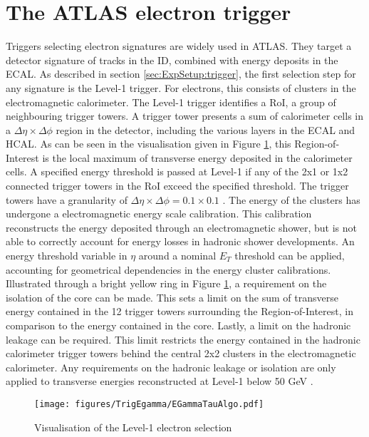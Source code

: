 \section{The ATLAS electron trigger}
\label{sec:trigg:Intro}
Triggers selecting electron signatures are widely used in ATLAS.  They target a detector signature of tracks in the \ac{ID},  combined with energy deposits in the \ac{ECAL}.
As described in section \ref{sec:ExpSetup:trigger},  the first selection step for any signature is the Level-1 trigger.  For electrons,  this consists of clusters in the electromagnetic calorimeter.  The Level-1 trigger identifies a \ac{RoI},  a group of neighbouring trigger towers.  A trigger tower presents a sum of calorimeter cells in a $\Delta \eta \times \Delta \phi$ region in the detector,  including the various layers in the \ac{ECAL} and \ac{HCAL}.  As can be seen in the visualisation given in Figure \ref{L1Vis},  this Region-of-Interest is the local maximum of transverse energy deposited in the calorimeter cells.  A specified energy threshold is passed at Level-1 if any of the 2x1 or 1x2 connected trigger towers in the \ac{RoI} exceed the specified threshold.  The trigger towers have a granularity of $\Delta \eta \times \Delta \phi = 0.1 \times 0.1$ \cite{TriggerSystem2015}. The energy of the clusters has undergone a electromagnetic energy scale calibration.  This calibration reconstructs the energy deposited through an electromagnetic shower,  but is not able to correctly account for energy losses in hadronic shower developments.  An energy threshold variable in $\eta$ around a nominal $E_T$ threshold can be applied,  accounting for geometrical dependencies in the energy cluster calibrations.  Illustrated through a bright yellow ring in Figure \ref{L1Vis},  a requirement on the isolation of the core can be made. This sets a limit on the sum of transverse energy contained in the 12 trigger towers surrounding the Region-of-Interest,  in comparison to the energy contained in the core.  Lastly,  a limit on the hadronic leakage can be required.  This limit restricts the energy contained in the hadronic calorimeter trigger towers behind the central 2x2 clusters in the electromagnetic calorimeter.
Any requirements on the hadronic leakage or isolation are only applied to transverse energies reconstructed at Level-1 below 50 GeV \cite{TrigEgammaPaper}.

\begin{figure}[htb!]
\centering
\texttt{[image: figures/TrigEgamma/EGammaTauAlgo.pdf]}
\caption{Visualisation of the Level-1 electron selection \cite{TriggerSystem2015} \label{L1Vis}}
\end{figure}

